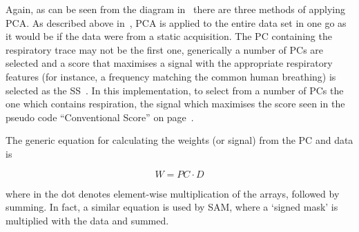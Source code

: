                 Again, as can be seen from the diagram in~ there are three methods of applying \gls{PCA}. As described above in~, \gls{PCA} is applied to the entire data set in one go as it would be if the data were from a static acquisition. The \gls{PC} containing the respiratory trace may not be the first one, generically a number of \glspl{PC} are selected and a score that maximises a signal with the appropriate respiratory features (for instance, a frequency matching the common human breathing) is selected as the \gls{SS}~\parencite{Bertolli2017}. In this implementation, to select from a number of \glspl{PC} the one which contains respiration, the signal which maximises the score seen in the pseudo code ``Conventional Score'' on page~\pageref{alg:pca_data_driven_surrogate_signal_extraction_methods_for_dynamic_pet_methods_conventional_pca_conventional_score_pseudo_code}.
                
                The generic equation for calculating the weights (or signal) from the \gls{PC} and data is
                    
                \begin{equation} \label{eq:pca_data_driven_surrogate_signal_extraction_methods_for_dynamic_pet_methods_conventional_pca_conventional_score_pseudo_code_pc_weights}
                    W = PC \cdot D
                \end{equation}
                    
                \noindent where in  the dot denotes element-wise multiplication of the arrays, followed by summing. In fact, a similar equation is used by \gls{SAM}, where a `signed mask' is multiplied with the data and summed.


